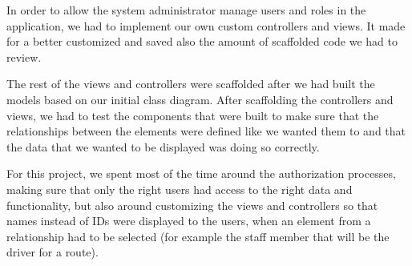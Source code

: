In order to allow the system administrator manage users and roles in the
application, we had to implement our own custom controllers and views.
It made for a better customized and saved also the amount of scaffolded code
we had to review.

The rest of the views and controllers were scaffolded after we had built the
models based on our initial class diagram. After scaffolding the controllers
and views, we had to test the components that were built to make sure that
the relationships between the elements were defined like we wanted them to
and that the data that we wanted to be displayed was doing so correctly.

For this project, we spent most of the time around the authorization processes,
making sure that only the right users had access to the right data and functionality,
but also around customizing the views and controllers so that names instead of IDs
were displayed to the users, when an element from a relationship had to be selected
(for example the staff member that will be the driver for a route).
